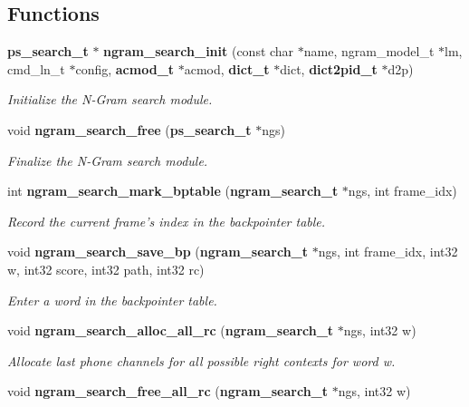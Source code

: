 \subsection*{Functions}
\begin{DoxyCompactItemize}
\item 
{\bf ps\-\_\-search\-\_\-t} $\ast$ {\bf ngram\-\_\-search\-\_\-init} (const char $\ast$name, ngram\-\_\-model\-\_\-t $\ast$lm, cmd\-\_\-ln\-\_\-t $\ast$config, {\bf acmod\-\_\-t} $\ast$acmod, {\bf dict\-\_\-t} $\ast$dict, {\bf dict2pid\-\_\-t} $\ast$d2p)\label{ngram__search_8h_a04f80b377c847026254fb85596e2f43c}

\begin{DoxyCompactList}\small\item\em Initialize the N-\/\-Gram search module. \end{DoxyCompactList}\item 
void {\bf ngram\-\_\-search\-\_\-free} ({\bf ps\-\_\-search\-\_\-t} $\ast$ngs)\label{ngram__search_8h_a9bafaa4af5a9a4f9e76a8daf54ac4a11}

\begin{DoxyCompactList}\small\item\em Finalize the N-\/\-Gram search module. \end{DoxyCompactList}\item 
int {\bf ngram\-\_\-search\-\_\-mark\-\_\-bptable} ({\bf ngram\-\_\-search\-\_\-t} $\ast$ngs, int frame\-\_\-idx)
\begin{DoxyCompactList}\small\item\em Record the current frame's index in the backpointer table. \end{DoxyCompactList}\item 
void {\bf ngram\-\_\-search\-\_\-save\-\_\-bp} ({\bf ngram\-\_\-search\-\_\-t} $\ast$ngs, int frame\-\_\-idx, int32 w, int32 score, int32 path, int32 rc)\label{ngram__search_8h_ae36649be6f5a2190e759e7ed13bd7b6b}

\begin{DoxyCompactList}\small\item\em Enter a word in the backpointer table. \end{DoxyCompactList}\item 
void {\bf ngram\-\_\-search\-\_\-alloc\-\_\-all\-\_\-rc} ({\bf ngram\-\_\-search\-\_\-t} $\ast$ngs, int32 w)\label{ngram__search_8h_a1ddcc1a9cb3e164ceb2140097ed23a3e}

\begin{DoxyCompactList}\small\item\em Allocate last phone channels for all possible right contexts for word w. \end{DoxyCompactList}\item 
void {\bf ngram\-\_\-search\-\_\-free\-\_\-all\-\_\-rc} ({\bf ngram\-\_\-search\-\_\-t} $\ast$ngs, int32 w)\label{ngram__search_8h_a15477192481dffcb29e9c4167eff6c3c}


\end{DoxyCompactItemize}
